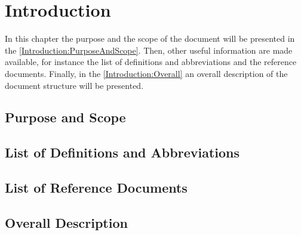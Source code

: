\documentclass[\mainpath/main]{subfiles}
\begin{document}
\chapter{Introduction} %
\label{Introduction}

\setmyfancystyle

In this chapter the purpose and the scope of the document will be presented in the \autoref{Introduction:PurposeAndScope}. Then, other useful information are made available, for instance the list of definitions and abbreviations and the reference documents. Finally, in the \autoref{Introduction:Overall} an overall description of the document structure will be presented.

\section{Purpose and Scope}
\label{Introduction:PurposeAndScope}


\section{List of Definitions and Abbreviations}
\label{Introduction:DefinitionsAndAbbrevations}

\section{List of Reference Documents}
\label{Introduction:ReferenceDocuments}

\section{Overall Description}
\label{Introduction:Overall}
\end{document}
